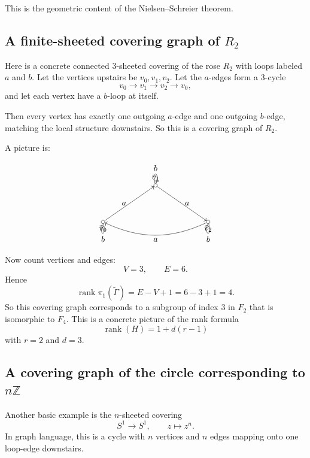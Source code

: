 \documentclass[12pt,a4paper]{article}
\DeclareMathOperator{\rank}{rank}
\theoremstyle{notespace}
\begin{document}
This is the geometric content of the Nielsen--Schreier theorem.

\subsection{A finite-sheeted covering graph of \(R_2\)}

Here is a concrete connected \(3\)-sheeted covering of the rose \(R_2\) with loops labeled \(a\) and \(b\). Let the vertices upstairs be \(v_0,v_1,v_2\). Let the \(a\)-edges form a \(3\)-cycle
\[
v_0 \to v_1 \to v_2 \to v_0,
\]
and let each vertex have a \(b\)-loop at itself.

Then every vertex has exactly one outgoing \(a\)-edge and one outgoing \(b\)-edge, matching the local structure downstairs. So this is a covering graph of \(R_2\).

A picture is:

\[
\begin{tikzpicture}[scale=1.1,baseline=(current bounding box.center)]
	\node[circle,draw,inner sep=1.5pt,label=below:\(v_0\)] (v0) at (0,0) {};
	\node[circle,draw,inner sep=1.5pt,label=above:\(v_1\)] (v1) at (2,1.4) {};
	\node[circle,draw,inner sep=1.5pt,label=below:\(v_2\)] (v2) at (4,0) {};
	
	\draw[->] (v0) -- node[left] {\(a\)} (v1);
	\draw[->] (v1) -- node[right] {\(a\)} (v2);
	\draw[->] (v2) to[bend left=25] node[below] {\(a\)} (v0);
	
	\draw[->] (v0) edge[loop below] node {\(b\)} (v0);
	\draw[->] (v1) edge[loop above] node {\(b\)} (v1);
	\draw[->] (v2) edge[loop below] node {\(b\)} (v2);
\end{tikzpicture}
\]

Now count vertices and edges:
\[
V=3,\qquad E=6.
\]
Hence
\[
\rank \pi_1(\widetilde{\Gamma})=E-V+1=6-3+1=4.
\]
So this covering graph corresponds to a subgroup of index \(3\) in \(F_2\) that is isomorphic to \(F_4\). This is a concrete picture of the rank formula
\[
\rank(H)=1+d(r-1)
\]
with \(r=2\) and \(d=3\).

\subsection{A covering graph of the circle corresponding to \(n\mathbb Z\)}

Another basic example is the \(n\)-sheeted covering
\[
S^1\to S^1,
\qquad
z\mapsto z^n.
\]
In graph language, this is a cycle with \(n\) vertices and \(n\) edges mapping onto one loop-edge downstairs.
\end{document}

